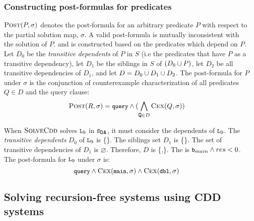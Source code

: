 \subsubsection{Constructing post-formulas for predicates}
\label{sec:cons-post}
$\textsc{Post}(P, \sigma)$ denotes the post-formula for an arbitrary predicate $P$
with respect to the partial solution map, $\sigma$. A valid
post-formula is mutually inconsistent with the solution of $P$.
%
and is constructed based on the predicates which depend on $P$.
%
Let $D_0$ be the \emph{transitive dependents} of $P$ in $S$ (i.e the
predicates that have $P$ as a transitive dependency),
let $D_1$ be the siblings in $S$ of $(D_0 \cup {P})$,
%
let $D_2$ be all transitive dependencies of $D_1$, and
let $D = D_0 \cup D_1 \cup D_2$.
The post-formula for $P$ under $\sigma$ is the conjunction of counterexample
characterization of all predicates $Q \in D$ and the query clause:
%
\[
\postctr(R, \sigma) =\cc{query} \land (\bigland_{\cc{Q} \in D} \vc{Q,\sigma})
\]
\begin{ex}
  \label{ex:ctx-ctr}
  When $\textsc{SolveCdd}$ solves $\cc{L}_9$ in $\mcchc$, it must consider
  the dependents of $\cc{L}_9$.
  The \emph{transitive dependents} $D_0$ of $\cc{L}_9$ is \{\}.
  The siblings set $D_1$ is \{\}.
  The set of transitive dependencies of $D_1$ is $\varnothing$. 
  Therefore, $D$ is \{,\}.
  The  is $\cc{b}_{main} \land res<0$.
  The post-formula for $\cc{L}_9$ under $\sigma$ is:
  $$\cc{query} \land \vc{\cc{main},\sigma} \land \vc{\cc{dbl},\sigma}$$
\end{ex}

\subsection{Solving recursion-free systems using CDD systems}
\label{sec:core-solver}

